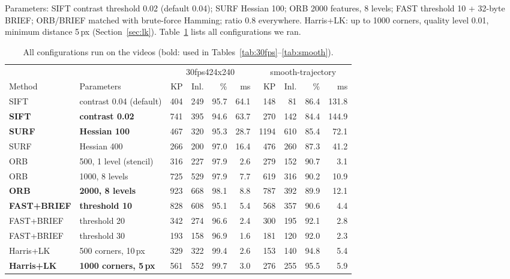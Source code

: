 \documentclass[11pt,a4paper]{article}
\newenvironment{keep}{\par\begin{lrbox}{\keepbox}\begin{minipage}{\linewidth}\setlength{\parskip}{0.4em}}{\end{minipage}\end{lrbox}%
  \noindent\usebox{\keepbox}\par}
\DeclareRobustCommand{\code}[1]{\begingroup\ttfamily\codebreaks#1\endgroup}
\newcommand{\codebreaks}{\renewcommand{\_}{\textunderscore\allowbreak}}
\begin{document}
\begin{keep}
Parameters: SIFT contrast threshold 0.02 (default 0.04); SURF Hessian 100; ORB 2000
features, 8 levels; FAST threshold 10 + 32-byte BRIEF; ORB/BRIEF matched with
brute-force Hamming; ratio 0.8 everywhere. Harris+LK: up to 1000 corners, quality level
0.01, minimum distance 5\,px (Section~\ref{sec:lk}). Table~\ref{tab:videosweep} lists all
configurations we ran.

\begin{table}[H]
  \centering\small
  \caption{All configurations run on the videos (bold: used in Tables~\ref{tab:30fps}--\ref{tab:smooth}).}
  \label{tab:videosweep}
  \begin{tabular}{llrrrr@{\hspace{1.5em}}rrrr}
    \toprule
    & & \multicolumn{4}{c}{\code{30fps\_424x240}} & \multicolumn{4}{c}{\code{smooth-trajectory}} \\
    Method & Parameters & KP & Inl. & \% & ms & KP & Inl. & \% & ms \\
    \midrule
    SIFT & contrast 0.04 (default) & 404 & 249 & 95.7 & 64.1 & 148 & 81 & 86.4 & 131.8 \\
    \textbf{SIFT} & \textbf{contrast 0.02} & 741 & 395 & 94.6 & 63.7 & 270 & 142 & 84.4 & 144.9 \\
    \textbf{SURF} & \textbf{Hessian 100} & 467 & 320 & 95.3 & 28.7 & 1194 & 610 & 85.4 & 72.1 \\
    SURF & Hessian 400 & 266 & 200 & 97.0 & 16.4 & 476 & 260 & 87.3 & 41.2 \\
    ORB & 500, 1 level (stencil) & 316 & 227 & 97.9 & 2.6 & 279 & 152 & 90.7 & 3.1 \\
    ORB & 1000, 8 levels & 725 & 529 & 97.9 & 7.7 & 619 & 316 & 90.2 & 10.9 \\
    \textbf{ORB} & \textbf{2000, 8 levels} & 923 & 668 & 98.1 & 8.8 & 787 & 392 & 89.9 & 12.1 \\
    \textbf{FAST+BRIEF} & \textbf{threshold 10} & 828 & 608 & 95.1 & 5.4 & 568 & 357 & 90.6 & 4.4 \\
    FAST+BRIEF & threshold 20 & 342 & 274 & 96.6 & 2.4 & 300 & 195 & 92.1 & 2.8 \\
    FAST+BRIEF & threshold 30 & 193 & 158 & 96.9 & 1.6 & 181 & 120 & 92.0 & 2.3 \\
    Harris+LK & 500 corners, 10\,px & 329 & 322 & 99.4 & 2.6 & 153 & 140 & 94.8 & 5.4 \\
    \textbf{Harris+LK} & \textbf{1000 corners, 5\,px} & 561 & 552 & 99.7 & 3.0 & 276 & 255 & 95.5 & 5.9 \\
    \bottomrule
  \end{tabular}
\end{table}
\end{keep}
\end{document}
